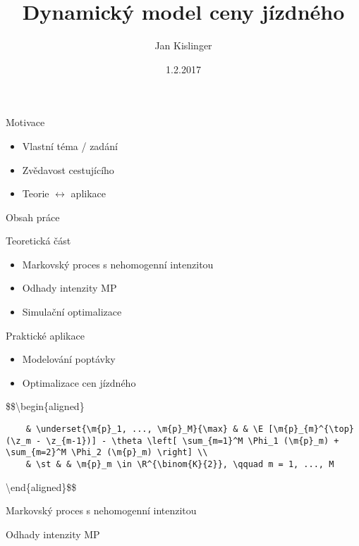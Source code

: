\documentclass[ignorenonframetext,]{beamer}
\title{Dynamický model ceny jízdného}
\author{Jan Kislinger}
\date{1.2.2017}
\providecommand{\tightlist}{%
\setlength{\itemsep}{0pt}\setlength{\parskip}{0pt}}
\begin{document}
\frame{\titlepage}

\begin{frame}{Motivace}

\begin{itemize}
\tightlist
\item
  Vlastní téma / zadání
\item
  Zvědavost cestujícího
\item
  Teorie \(\leftrightarrow\) aplikace
\end{itemize}

\end{frame}

\begin{frame}[fragile]{Obsah práce}

Teoretická část

\begin{itemize}
\tightlist
\item
  Markovský proces s nehomogenní intenzitou
\item
  Odhady intenzity MP
\item
  Simulační optimalizace
\end{itemize}

Praktické aplikace

\begin{itemize}
\tightlist
\item
  Modelování poptávky
\item
  Optimalizace cen jízdného
\end{itemize}

\$\$\textbackslash{}begin\{aligned\}

\begin{verbatim}
    & \underset{\m{p}_1, ..., \m{p}_M}{\max} & & \E [\m{p}_{m}^{\top} (\z_m - \z_{m-1})] - \theta \left[ \sum_{m=1}^M \Phi_1 (\m{p}_m) + \sum_{m=2}^M \Phi_2 (\m{p}_m) \right] \\
    & \st & & \m{p}_m \in \R^{\binom{K}{2}}, \qquad m = 1, ..., M
\end{verbatim}

\textbackslash{}end\{aligned\}\$\$

\end{frame}

\begin{frame}{Markovský proces s nehomogenní intenzitou}

\end{frame}

\begin{frame}{Odhady intenzity MP}

\end{frame}
\end{document}
